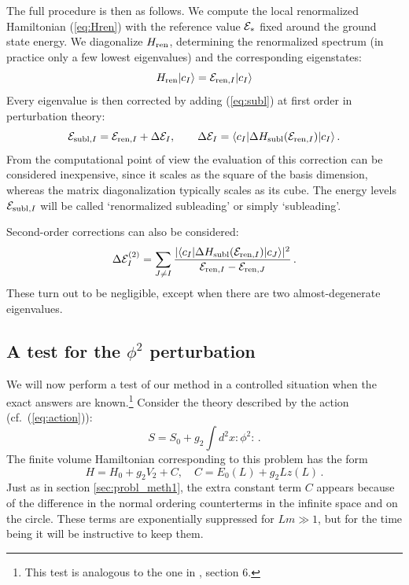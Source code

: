 \documentclass[11pt]{article}
\newcommand{\reef}[1]{(\ref{#1})}
\newcommand{\beq}{\begin{equation}}
\newcommand{\eeq}{\end{equation}}
\def\calE {{\cal E}}
\newcommand{\braket}[3]{\langle #1|#2|#3 \rangle}
\newcommand{\ket}[1]{|#1\rangle}
\def \Hren{H_{\rm ren}}
\def \Er{{\calE_{\rm *}}}
\numberwithin{equation}{section}
\begin{document}
The full procedure is then as follows. We compute the local renormalized Hamiltonian \reef{eq:Hren} with the reference value $\Er$ fixed around the ground state energy. We diagonalize $\Hren$, determining the renormalized spectrum (in practice only a few lowest eigenvalues) and the corresponding eigenstates:
\begin{equation}
\Hren \ket{c_I} = \calE_{{\rm ren},I}\ket{c_I}
\end{equation}
Every eigenvalue is then corrected by adding \reef{eq:subl} at first order in perturbation theory:
\begin{equation}
\label{eq:subl1ord}
\calE_{{\rm subl},I}=\calE_{{\rm ren},I}+ \Delta \calE_{I}, \qquad \Delta \calE_{I} = \braket{c_I}{\Delta H_{\rm subl}(\calE_{{\rm ren},I})}{c_I}\,.
\end{equation}
From the computational point of view the evaluation of this correction can be considered inexpensive, since it scales as the square of the basis dimension, whereas the matrix diagonalization typically scales as its cube. The energy levels $\calE_{{\rm subl},I}$ will be called `renormalized subleading' or simply `subleading'. 

Second-order corrections can also be considered:
\begin{equation}
\Delta \calE_I^{(2)}= \sum_{J \ne I} 
\frac
{|\braket{c_I}
{\Delta H_{\rm subl}(\calE_{{\rm ren},I})}
{c_J}|^2}
{\calE_{{\rm ren},I}-\calE_{{\rm ren},J}}\,.
\end{equation}
These turn out to be negligible, except when there are two almost-degenerate eigenvalues.

\subsection{A test for the $\phi^2$ perturbation}
\label{sec:phi2test}

We will now perform a test of our method in a controlled situation when the exact answers are known.\footnote{This test is analogous to the one in \cite{Hogervorst:2014rta}, section 6.} Consider the theory described by the action (cf.~\reef{eq:action}):
\beq
S=S_0+g_2 \int d^2x :\phi^2:\,.
\eeq
The finite volume Hamiltonian corresponding to this problem has the form 
\beq
H=H_0+g_2 V_2+ C,\quad C=E_0(L)+ g_2 L z(L) \,.
\eeq
Just as in section \ref{sec:probl_meth1}, the extra constant term $C$ appears because of the difference in the normal ordering counterterms in the infinite space and on the circle. These terms are exponentially suppressed for $L m\gg 1$, but for the time being it will be instructive to keep them.
\end{document}
